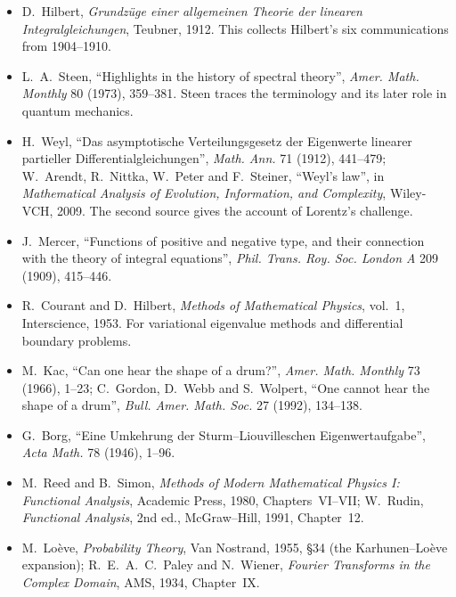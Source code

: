 \begin{itemize}
\item D.~Hilbert, \emph{Grundz\"uge einer allgemeinen Theorie der linearen Integralgleichungen}, Teubner, 1912. This collects Hilbert's six communications from 1904--1910.
\item L.~A.~Steen, ``Highlights in the history of spectral theory'', \emph{Amer. Math. Monthly} 80 (1973), 359--381. Steen traces the terminology and its later role in quantum mechanics.
\item H.~Weyl, ``Das asymptotische Verteilungsgesetz der Eigenwerte linearer partieller Differentialgleichungen'', \emph{Math. Ann.} 71 (1912), 441--479; W.~Arendt, R.~Nittka, W.~Peter and F.~Steiner, ``Weyl's law'', in
\emph{Mathematical Analysis of Evolution, Information, and Complexity}, Wiley-VCH, 2009. The second source gives the account of Lorentz's challenge.
\item J.~Mercer, ``Functions of positive and negative type, and their connection with the theory of integral equations'', \emph{Phil. Trans. Roy. Soc. London A} 209 (1909), 415--446.
\item R.~Courant and D.~Hilbert, \emph{Methods of Mathematical Physics}, vol.~1, Interscience, 1953. For variational eigenvalue methods and differential boundary problems.
\item M.~Kac, ``Can one hear the shape of a drum?'', \emph{Amer. Math. Monthly} 73 (1966), 1--23; C.~Gordon, D.~Webb and S.~Wolpert, ``One cannot hear the shape of a drum'', \emph{Bull. Amer. Math. Soc.} 27 (1992), 134--138.
\item G.~Borg, ``Eine Umkehrung der Sturm--Liouvilleschen Eigenwertaufgabe'', \emph{Acta Math.} 78 (1946), 1--96.
\item M.~Reed and B.~Simon, \emph{Methods of Modern Mathematical Physics I: Functional Analysis}, Academic Press, 1980, Chapters~VI--VII; W.~Rudin, \emph{Functional Analysis}, 2nd ed., McGraw--Hill, 1991, Chapter~12.
\item M.~Lo\`eve, \emph{Probability Theory}, Van Nostrand, 1955, \S34 (the Karhunen--Lo\`eve expansion); R.~E.~A.~C.~Paley and N.~Wiener, \emph{Fourier Transforms in the Complex Domain}, AMS, 1934, Chapter~IX.
\end{itemize}
